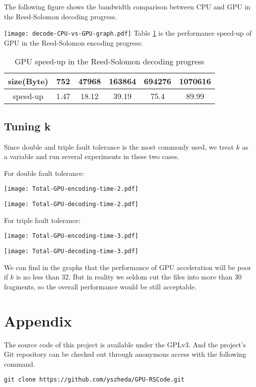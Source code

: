 \documentclass[a4paper]{article}
\begin{document}
The following figure shows the bandwidth comparison between CPU and GPU in the Reed-Solomon decoding progress.

\texttt{[image: decode-CPU-vs-GPU-graph.pdf]}
Table \ref{decoding-speed-up} is the performance speed-up of GPU in the Reed-Solomon encoding progress:
\begin{table}
\caption{
GPU speed-up in the Reed-Solomon decoding progress
}
\begin{center}
\begin{tabular}{|c|c|c|c|c|c|}
\hline
size(Byte) & 752  & 47968 & 163864 & 694276 & 1070616 \\
\hline
speed-up   & 1.47 & 18.12 & 39.19  & 75.4   & 89.99 \\
\hline
\end{tabular}
\end{center}
\label{decoding-speed-up}
\end{table}


\subsection{Tuning k}

Since double and triple fault tolerance is the most commonly used, we treat $k$ as a variable and run several experiments in these two cases.

For double fault tolerance:

\texttt{[image: Total-GPU-encoding-time-2.pdf]}

\texttt{[image: Total-GPU-decoding-time-2.pdf]}

For triple fault tolerance:

\texttt{[image: Total-GPU-encoding-time-3.pdf]}

\texttt{[image: Total-GPU-decoding-time-3.pdf]}

We can find in the graphs that the performance of GPU acceleration will be poor if $k$ is no less than 32. But in reality we seldom cut the files into more than 30 fragments, so the overall performance would be still acceptable.

\section{Appendix}

The source code of this project is available under the GPLv3. And the project's Git repository can be checked out through anonymous access with the following command.
\begin{verbatim}
git clone https://github.com/yszheda/GPU-RSCode.git
\end{verbatim}




\end{document}
